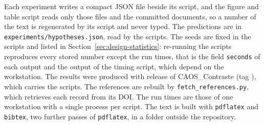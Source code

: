 Each experiment writes a compact JSON file beside its script, and the figure and table script reads only those files and the
committed documents, so a number of the text is regenerated by its script and never typed. The predictions are in
\texttt{experiments/hypotheses.json}, read by the scripts. The seeds are fixed in the
scripts and listed in Section~\ref{sec:design-statistics}: re-running the scripts reproduces every stored number except the run
times, that is the field \texttt{seconds} of each output and the output of the timing script, which depend on the workstation. The results were produced with release \docversion{} of CAOS\_Contraste (tag \docversion{}), which carries the scripts. %
The
references are rebuilt by \texttt{fetch\_references.py}, which retrieves each record from its DOI. The run times are those of one
workstation with a single process per script. The text is built with \texttt{pdflatex} and \texttt{bibtex}, two further passes of
\texttt{pdflatex}, in a folder outside the repository.
